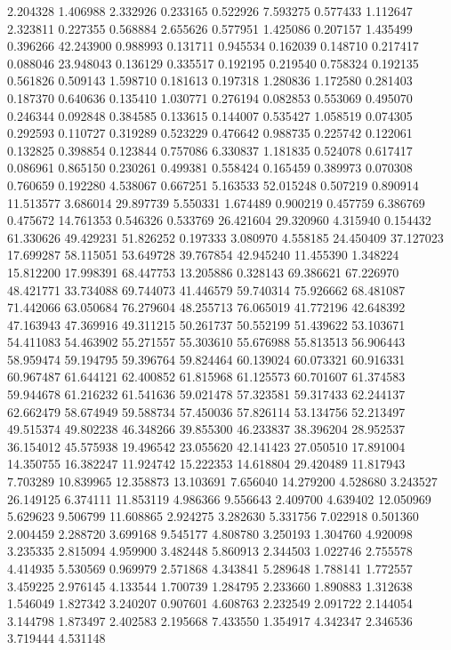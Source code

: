 2.204328
1.406988
2.332926
0.233165
0.522926
7.593275
0.577433
1.112647
2.323811
0.227355
0.568884
2.655626
0.577951
1.425086
0.207157
1.435499
0.396266
42.243900
0.988993
0.131711
0.945534
0.162039
0.148710
0.217417
0.088046
23.948043
0.136129
0.335517
0.192195
0.219540
0.758324
0.192135
0.561826
0.509143
1.598710
0.181613
0.197318
1.280836
1.172580
0.281403
0.187370
0.640636
0.135410
1.030771
0.276194
0.082853
0.553069
0.495070
0.246344
0.092848
0.384585
0.133615
0.144007
0.535427
1.058519
0.074305
0.292593
0.110727
0.319289
0.523229
0.476642
0.988735
0.225742
0.122061
0.132825
0.398854
0.123844
0.757086
6.330837
1.181835
0.524078
0.617417
0.086961
0.865150
0.230261
0.499381
0.558424
0.165459
0.389973
0.070308
0.760659
0.192280
4.538067
0.667251
5.163533
52.015248
0.507219
0.890914
11.513577
3.686014
29.897739
5.550331
1.674489
0.900219
0.457759
6.386769
0.475672
14.761353
0.546326
0.533769
26.421604
29.320960
4.315940
0.154432
61.330626
49.429231
51.826252
0.197333
3.080970
4.558185
24.450409
37.127023
17.699287
58.115051
53.649728
39.767854
42.945240
11.455390
1.348224
15.812200
17.998391
68.447753
13.205886
0.328143
69.386621
67.226970
48.421771
33.734088
69.744073
41.446579
59.740314
75.926662
68.481087
71.442066
63.050684
76.279604
48.255713
76.065019
41.772196
42.648392
47.163943
47.369916
49.311215
50.261737
50.552199
51.439622
53.103671
54.411083
54.463902
55.271557
55.303610
55.676988
55.813513
56.906443
58.959474
59.194795
59.396764
59.824464
60.139024
60.073321
60.916331
60.967487
61.644121
62.400852
61.815968
61.125573
60.701607
61.374583
59.944678
61.216232
61.541636
59.021478
57.323581
59.317433
62.244137
62.662479
58.674949
59.588734
57.450036
57.826114
53.134756
52.213497
49.515374
49.802238
46.348266
39.855300
46.233837
38.396204
28.952537
36.154012
45.575938
19.496542
23.055620
42.141423
27.050510
17.891004
14.350755
16.382247
11.924742
15.222353
14.618804
29.420489
11.817943
7.703289
10.839965
12.358873
13.103691
7.656040
14.279200
4.528680
3.243527
26.149125
6.374111
11.853119
4.986366
9.556643
2.409700
4.639402
12.050969
5.629623
9.506799
11.608865
2.924275
3.282630
5.331756
7.022918
0.501360
2.004459
2.288720
3.699168
9.545177
4.808780
3.250193
1.304760
4.920098
3.235335
2.815094
4.959900
3.482448
5.860913
2.344503
1.022746
2.755578
4.414935
5.530569
0.969979
2.571868
4.343841
5.289648
1.788141
1.772557
3.459225
2.976145
4.133544
1.700739
1.284795
2.233660
1.890883
1.312638
1.546049
1.827342
3.240207
0.907601
4.608763
2.232549
2.091722
2.144054
3.144798
1.873497
2.402583
2.195668
7.433550
1.354917
4.342347
2.346536
3.719444
4.531148
